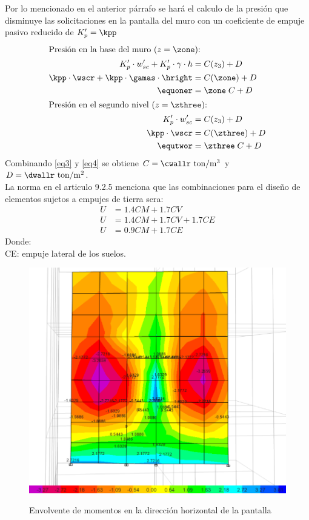 \FPset{}

\noindent Por lo mencionado en el anterior párrafo se hará el calculo de la presión que disminuye las solicitaciones en la pantalla del muro con un coeficiente de empuje pasivo reducido de $K_{p}^{\prime}=\kpp$
\begin{align}
\shortintertext{Presión en la base del muro ($z=\zone$):} K_{p}^{\prime}\cdot w_{sc}^{\prime}+K_{p}^{\prime}\cdot \gamma \cdot h&=C(z_{3})+D\notag\\
\kpp\cdot \wscr+\kpp\cdot \gamas \cdot \hright&=C(\zone)+D\notag\\
\equoner&=\zone\; C+D\label{eq3}\\ \shortintertext{Presión en el segundo nivel ($z=\zthree$):}
K_{p}^{\prime}\cdot w_{sc}^{\prime}&=C(z_{3})+D\notag\\
\kpp\cdot \wscr&=C(\zthree)+D\\
\equtwor&=\zthree\; C+D\label{eq4}
\end{align}
\noindent
Combinando \ref{eq3} y \ref{eq4} se obtiene $C=\cwallr\mathrm{~ton/m^3}$ y $D=\dwallr\mathrm{~ton/m^2}$.\\
La norma \cite{E-060} en el articulo 9.2.5 menciona que las combinaciones para el diseño de elementos sujetos a empujes de tierra sera:
\begin{align*}
    U&=1.4CM+1.7CV\\
    U&=1.4CM+1.7CV+1.7CE\\
    U&=0.9CM+1.7CE
\end{align*}
\noindent Donde:\\
CE: empuje lateral de los suelos.
\begin{figure}[h!]
    \centering
    \caption{Envolvente de momentos en la dirección horizontal de la pantalla}
    \includegraphics[scale=0.6]{IMAGENES/m11.PNG}
    \label{m11}
\end{figure} 

